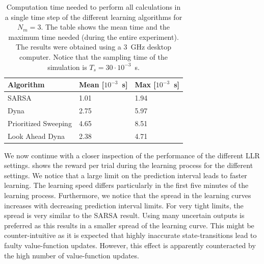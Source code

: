 \begin{table}[htbp]
	\centering
	\caption[Computation times of the learning algorithms]{Computation time needed to perform all calculations in a single time step of the different learning algorithms for $N_m=3$. The table shows the mean time and the maximum time needed (during the entire experiment). The results were obtained using a 3~GHz desktop computer. Notice that the sampling time of the simulation is $T_s = 30\cdot 10^{-3}$~s.}
		\begin{tabular}{l|ll}
			\textbf{Algorithm} & \textbf{Mean [$10^{-3}$~s]} & \textbf{Max [$10^{-3}$~s]} \\ 
			\hline\hline
			SARSA & 1.01 & 1.94 \\
			Dyna  & 2.75 & 5.97 \\
			Prioritized Sweeping & 4.65 & 8.51 \\
			Look Ahead Dyna & 2.38 & 4.71 
		\end{tabular}
	\label{tab:PS-computation times}
\end{table}


We now continue with a closer inspection of the performance of the different \ac{LLR} settings.  shows the reward per trial during the learning process for the different settings. We notice that a large limit on the prediction interval leads to faster learning. The learning speed differs particularly in the first five minutes of the learning process. Furthermore, we notice that the spread in the learning curves increases with decreasing prediction interval limits. For very tight limits, the spread is very similar to the SARSA result. Using many uncertain outputs is preferred as this results in a smaller spread of the learning curve. This might be counter-intuitive as it is expected that highly inaccurate state-transitions lead to faulty value-function updates. However, this effect is apparently counteracted by the high number of value-function updates.

